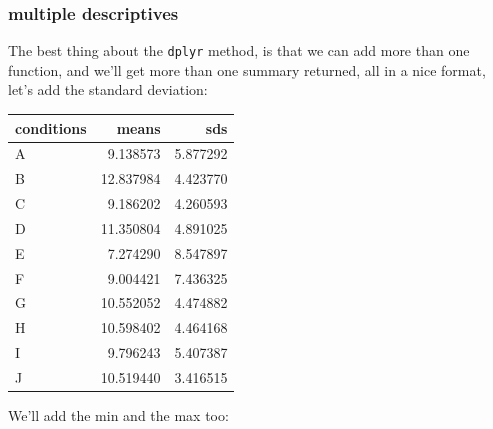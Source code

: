 \documentclass[]{book}
\newenvironment{Shaded}{\begin{snugshade}}{\end{snugshade}}
\newcommand{\KeywordTok}[1]{\textcolor[rgb]{0.13,0.29,0.53}{\textbf{#1}}}
\newcommand{\DataTypeTok}[1]{\textcolor[rgb]{0.13,0.29,0.53}{#1}}
\newcommand{\StringTok}[1]{\textcolor[rgb]{0.31,0.60,0.02}{#1}}
\newcommand{\OperatorTok}[1]{\textcolor[rgb]{0.81,0.36,0.00}{\textbf{#1}}}
\newcommand{\NormalTok}[1]{#1}
\begin{document}
\subsubsection{multiple descriptives}\label{multiple-descriptives}

The best thing about the \texttt{dplyr} method, is that we can add more
than one function, and we'll get more than one summary returned, all in
a nice format, let's add the standard deviation:

\begin{Shaded}
\end{Shaded}

\begin{tabular}{l|r|r}
\hline
conditions & means & sds\\
\hline
A & 9.138573 & 5.877292\\
\hline
B & 12.837984 & 4.423770\\
\hline
C & 9.186202 & 4.260593\\
\hline
D & 11.350804 & 4.891025\\
\hline
E & 7.274290 & 8.547897\\
\hline
F & 9.004421 & 7.436325\\
\hline
G & 10.552052 & 4.474882\\
\hline
H & 10.598402 & 4.464168\\
\hline
I & 9.796243 & 5.407387\\
\hline
J & 10.519440 & 3.416515\\
\hline
\end{tabular}

We'll add the min and the max too:

\begin{Shaded}
\end{Shaded}
\end{document}

